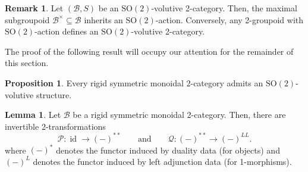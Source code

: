 \documentclass{article}
\newcommand{\id}{\operatorname{id}}%
\newcommand{\Sotwo}{\operatorname{SO(2)}}
\newcommand{\B}{\mathcal{B}}
\numberwithin{equation}{section}
\theoremstyle{definition}
\newtheorem{lemma}[definition]{Lemma}
\newtheorem{proposition}[definition]{Proposition}
\newtheorem{remark}[definition]{Remark}
\theoremstyle{theorem}
\begin{document}
\begin{remark}
    Let $(\B,S)$ be an $\Sotwo$-volutive 2-category. Then, the maximal subgroupoid $\B^\times \subseteq \B$ inherits an $\Sotwo$-action. Conversely, any 
    2-groupoid with $\Sotwo$-action defines an $\Sotwo$-volutive 2-category. 
\end{remark}
The proof of the following result will occupy our attention for the remainder of this section. 
\begin{proposition}\label{Proposition: rigid symmetric monoidal 2-categories have Sotwo volutive structures}
    Every rigid symmetric monoidal 2-category admits an $\Sotwo$-volutive structure.
\end{proposition}
\begin{lemma}
    Let $\B$ be a rigid symmetric monoidal 2-category. Then, there are invertible 2-transformations 
    \begin{equation}
        \mathcal{P} \colon \id \to (-)^{**} \qquad \text{and} \qquad \mathcal{Q} \colon (-)^{**} \to (-)^{LL}.
    \end{equation}
    where $(-)^*$ denotes the functor induced by duality data (for objects) and $(-)^L$ denotes the functor induced by left adjunction data (for 1-morphisms). 
\end{lemma}
\end{document}
